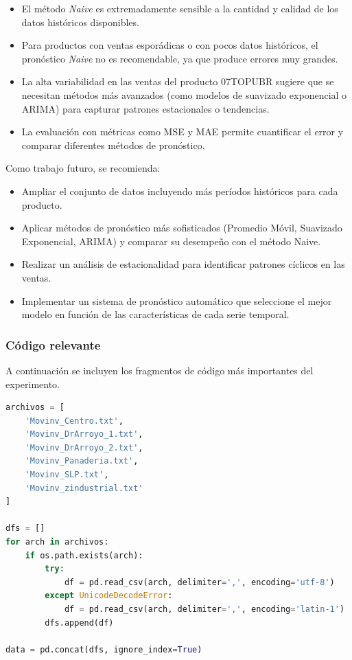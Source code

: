 \documentclass[12pt]{article}
\begin{document}
\begin{itemize}
    \item El método \textit{Naive} es extremadamente sensible a la cantidad y calidad de los datos históricos disponibles.
    \item Para productos con ventas esporádicas o con pocos datos históricos, el pronóstico \textit{Naive} no es recomendable, ya que produce errores muy grandes.
    \item La alta variabilidad en las ventas del producto 07TOPUBR sugiere que se necesitan métodos más avanzados (como modelos de suavizado exponencial o ARIMA) para capturar patrones estacionales o tendencias.
    \item La evaluación con métricas como MSE y MAE permite cuantificar el error y comparar diferentes métodos de pronóstico.
\end{itemize}

Como trabajo futuro, se recomienda:

\begin{itemize}
    \item Ampliar el conjunto de datos incluyendo más períodos históricos para cada producto.
    \item Aplicar métodos de pronóstico más sofisticados (Promedio Móvil, Suavizado Exponencial, ARIMA) y comparar su desempeño con el método Naive.
    \item Realizar un análisis de estacionalidad para identificar patrones cíclicos en las ventas.
    \item Implementar un sistema de pronóstico automático que seleccione el mejor modelo en función de las características de cada serie temporal.
\end{itemize}

\subsubsection*{Código relevante}

A continuación se incluyen los fragmentos de código más importantes del experimento.

\begin{lstlisting}[language=Python, caption=Carga y combinación de datos., label=lst:carga_datos]
archivos = [
    'Movinv_Centro.txt',
    'Movinv_DrArroyo_1.txt',
    'Movinv_DrArroyo_2.txt',
    'Movinv_Panaderia.txt',
    'Movinv_SLP.txt',
    'Movinv_zindustrial.txt'
]

dfs = []
for arch in archivos:
    if os.path.exists(arch):
        try:
            df = pd.read_csv(arch, delimiter=',', encoding='utf-8')
        except UnicodeDecodeError:
            df = pd.read_csv(arch, delimiter=',', encoding='latin-1')
        dfs.append(df)

data = pd.concat(dfs, ignore_index=True)
\end{lstlisting}
\end{document}

